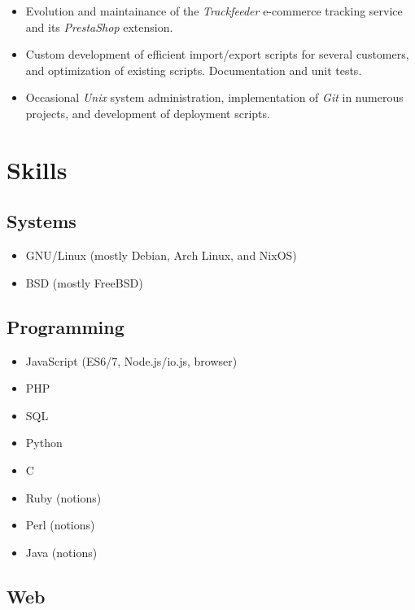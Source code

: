 \documentclass[a4paper]{article}
\begin{document}
\begin{itemize}
  \item Evolution and maintainance of the \textit{Trackfeeder}
  e-commerce tracking service and its \textit{PrestaShop} extension.
  \item Custom development of efficient import/export scripts for
  several customers, and optimization of existing scripts. Documentation
  and unit tests.
  \item Occasional \textit{Unix} system administration, implementation
  of \textit{Git} in numerous projects, and development of deployment
  scripts.

\end{itemize}

\clearpage

\section*{Skills}

\subsection*{Systems}

\begin{itemize}
  \item GNU/Linux (mostly Debian, Arch Linux, and NixOS)
  \item BSD (mostly FreeBSD)
\end{itemize}

\subsection*{Programming}

\begin{itemize}
  \item JavaScript (ES6/7, Node.js/io.js, browser)
  \item PHP
  \item SQL
  \item Python
  \item C
  \item Ruby (notions)
  \item Perl (notions)
  \item Java (notions)
\end{itemize}

\subsection*{Web}
\end{document}
